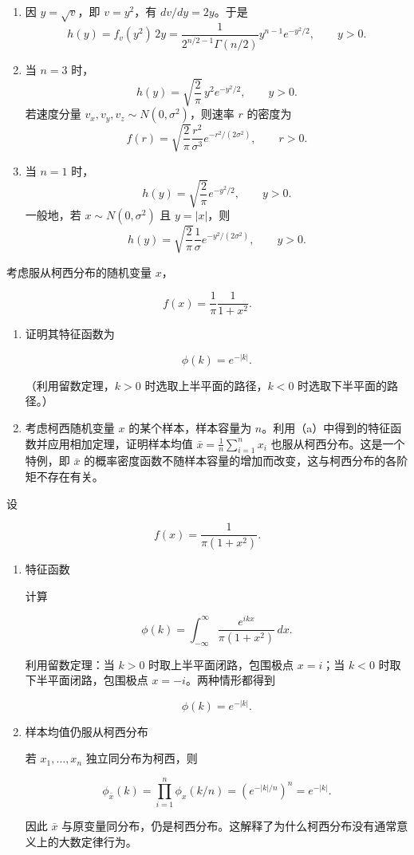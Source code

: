 \begin{question}
\begin{solution}
\begin{enumerate}
\item 因 \(y=\sqrt v\)，即 \(v=y^2\)，有 \(dv/dy=2y\)。于是
\[
h(y)=f_v(y^2)\,2y
=\frac{1}{2^{n/2-1}\Gamma(n/2)}y^{n-1}e^{-y^2/2},
\qquad y>0.
\]

\item 当 \(n=3\) 时，
\[
h(y)=\sqrt{\frac{2}{\pi}}\,y^2e^{-y^2/2},\qquad y>0.
\]
若速度分量 \(v_x,v_y,v_z\sim N(0,\sigma^2)\)，则速率 \(r\) 的密度为
\[
f(r)=\sqrt{\frac{2}{\pi}}\frac{r^2}{\sigma^3}e^{-r^2/(2\sigma^2)},\qquad r>0.
\]

\item 当 \(n=1\) 时，
\[
h(y)=\sqrt{\frac{2}{\pi}}e^{-y^2/2},\qquad y>0.
\]
一般地，若 \(x\sim N(0,\sigma^2)\) 且 \(y=|x|\)，则
\[
h(y)=\sqrt{\frac{2}{\pi}}\frac1{\sigma}e^{-y^2/(2\sigma^2)},\qquad y>0.
\]
\end{enumerate}
\end{solution}
\end{question}


\begin{question}
考虑服从柯西分布的随机变量 \(x\)，

\[
f(x)=\frac{1}{\pi}\frac{1}{1+x^2}.
\]

\begin{enumerate}
\item 证明其特征函数为

\[
\phi(k)=e^{-|k|}.
\]

（利用留数定理，\(k>0\) 时选取上半平面的路径，\(k<0\)
时选取下半平面的路径。）

\item 考虑柯西随机变量 \(x\) 的某个样本，样本容量为
\(n\)。利用（a）中得到的特征函数并应用相加定理，证明样本均值
\(\bar x=\frac1n\sum_{i=1}^{n}x_i\) 也服从柯西分布。这是一个特例，即
\(\bar x\)
的概率密度函数不随样本容量的增加而改变，这与柯西分布的各阶矩不存在有关。
\end{enumerate}
\begin{solution}
设

\[
f(x)=\frac{1}{\pi(1+x^2)}.
\]

\begin{enumerate}
\item 特征函数

计算

\[
\phi(k)=\int_{-\infty}^{\infty}\frac{e^{ikx}}{\pi(1+x^2)}\,dx.
\]

利用留数定理：当 \(k>0\) 时取上半平面闭路，包围极点 \(x=i\)；当 \(k<0\)
时取下半平面闭路，包围极点 \(x=-i\)。两种情形都得到

\[
\phi(k)=e^{-|k|}.
\]

\item 样本均值仍服从柯西分布

若 \(x_1,\dots,x_n\) 独立同分布为柯西，则

\[
\phi_{\bar x}(k)
=\prod_{i=1}^n \phi_x(k/n)
=\left(e^{-|k|/n}\right)^n
=e^{-|k|}.
\]

因此 \(\bar x\)
与原变量同分布，仍是柯西分布。这解释了为什么柯西分布没有通常意义上的大数定律行为。
\end{enumerate}
\end{solution}
\end{question}


